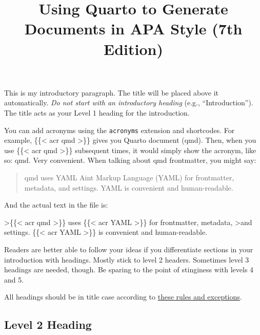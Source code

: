 \documentclass[
  man,
  floatsintext,
  longtable,
  colorlinks=true,linkcolor=blue,citecolor=blue,urlcolor=blue]{apa7}
\title{Using Quarto to Generate Documents in APA Style (7th Edition)}
\newenvironment{Shaded}{\begin{snugshade}}{\end{snugshade}}
\newcommand{\AttributeTok}[1]{\textcolor[rgb]{0.40,0.45,0.13}{#1}}
\begin{document}
\maketitle
\setcounter{secnumdepth}{-\maxdimen} %

\setlength\LTleft{0pt}

\resetlinenumber[1]

This is my introductory paragraph. The title will be placed above it
automatically. \emph{Do not start with an introductory heading} (e.g.,
``Introduction''). The title acts as your Level 1 heading for the
introduction.

You can add acronyms using the \texttt{acronyms} extension and
shortcodes. For example, \{\{\textless{} acr qmd \textgreater\}\} gives
you Quarto document (qmd). Then, when you use
\{\{\textless{} acr qmd \textgreater\}\} subsequent times, it would
simply show the acronym, like so: qmd. Very convenient. When talking
about qmd frontmatter, you might say:

\begin{quote}
qmd uses YAML Aint Markup Language (YAML) for frontmatter, metadata, and
settings. YAML is convenient and human-readable.
\end{quote}

\noindent And the actual text in the file is:

\begin{Shaded}
\begin{Highlighting}[]
\AttributeTok{\textgreater{}\{\{\textless{} acr qmd \textgreater{}\}\} uses \{\{\textless{} acr YAML \textgreater{}\}\} for frontmatter, metadata,}
\AttributeTok{\textgreater{}and settings. \{\{\textless{} acr YAML \textgreater{}\}\} is convenient and human{-}readable.}
\end{Highlighting}
\end{Shaded}

 Readers are better able to follow your ideas if you differentiate
sections in your introduction with headings. Mostly stick to level 2
headers. Sometimes level 3 headings are needed, though. Be sparing to
the point of stinginess with levels 4 and 5.

All headings should be in title case according to
\href{https://apastyle.apa.org/style-grammar-guidelines/capitalization/title-case}{these
rules and exceptions}.

\subsection{Level 2 Heading}\label{level-2-heading}
\end{document}
